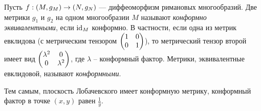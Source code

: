 \documentclass[a4paper]{report}
\begin{document}
    Пусть $f: (M, g_M) \rightarrow (N, g_N)$ --- диффеоморфизм римановых многообразий.
    Две метрики $g_1$ и $g_2$ на одном многообразии $M$ называют \emph{конформно эквивалентными}, если $\operatorname{id}_M$ конформно.
    В частности, если одна из метрик евклидова (с метрическим тензором $\begin{pmatrix}1 & 0 \\ 0 & 1\end{pmatrix}$), то метрический тензор второй имеет вид $\begin{pmatrix}\lambda^2 & 0 \\ 0 & \lambda^2\end{pmatrix}$, где $\lambda$ -- конформный фактор. Метрики, эквивалентные евклидовой, называют \emph{конформными}.

    Тем самым, плоскость Лобачевского имеет конформную метрику, конформный фактор в точке $(x, y)$ равен $\frac{1}{y}$.
\end{document}
